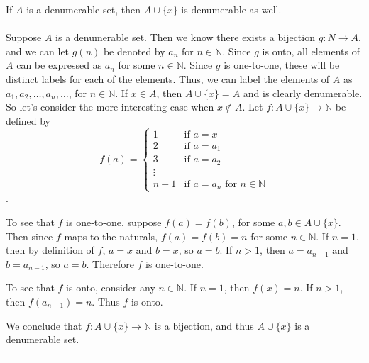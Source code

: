 \documentclass[11pt]{hmcpset}
\newenvironment{problem1}[1]{\noindent {\bf Problem #1}}
{\medskip}
\newenvironment{proof}{\noindent {\bf Proof:} \\}{\hfill
\rule{1mm}{3mm} \bigskip}
\begin{document}
\begin{problem1}{5} If $A$ is a denumerable set, then $A\cup\{x\}$ is denumerable as well.\\
\begin{proof}\indent Suppose $A$ is a denumerable set. Then we know there exists a bijection $g:N\to A$, and we can let $g(n)$ be denoted by $a_n$ for $n\in\mathbb{N}$. Since $g$ is onto, all elements of $A$ can be expressed as $a_n$ for some $n\in\mathbb{N}$. Since $g$ is one-to-one, these will be distinct labels for each of the elements. Thus, we can label the elements of $A$ as $a_1,a_2,\ldots, a_n,\ldots$, for $n\in \mathbb{N}.$ If $x\in A$, then $A\cup\{x\}=A$ and is clearly denumerable. So let's consider the more interesting case when $x\notin A$. Let $f:A\cup\{x\}\to\mathbb{N}$ be defined by $$f(a)=\begin{cases}1 & \text{if $a=x$}\\ 2 & \text{if $a=a_1$}\\ 3 & \text{if $a=a_2$}\\ \vdots \\n+1 & \text{if $a=a_n$ for $n\in\mathbb{N}$} \end{cases}$$.

To see that $f$ is one-to-one, suppose $f(a)=f(b)$, for some $a,b\in A\cup\{x\}$. Then since $f$ maps to the naturals, $f(a)=f(b)=n$ for some $n\in\mathbb{N}$. If $n=1$, then by definition of $f$, $a=x$ and $b=x$, so $a=b$. If $n>1$, then $a=a_{n-1}$ and $b=a_{n-1}$, so $a=b$. Therefore $f$ is one-to-one.

To see that $f$ is onto, consider any $n\in\mathbb{N}$. If $n=1$, then $f(x)=n$. If $n>1$, then $f(a_{n-1})=n$. Thus $f$ is onto.

We conclude that $f:A\cup\{x\}\to\mathbb{N}$ is a bijection, and thus $A\cup\{x\}$ is a denumerable set. 
\end{proof}
\end{problem1}
\end{document}
